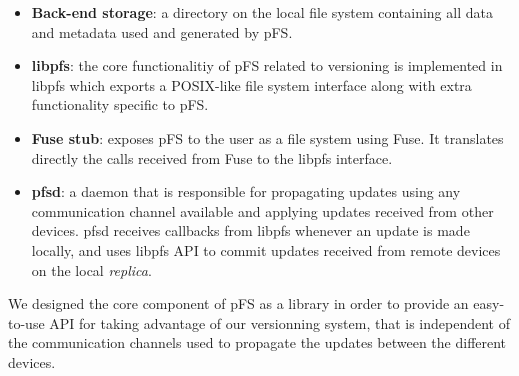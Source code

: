 \begin {itemize}
\item \textbf{Back-end storage}: a directory on the local file system
  containing all data and metadata used and generated by pFS.
\item \textbf{libpfs}: the core functionalitiy of pFS related to
  versioning is implemented in libpfs which exports a POSIX-like file
  system interface along with extra functionality specific to pFS.
\item \textbf{Fuse stub}: exposes pFS to the user as a file system
  using Fuse. It translates directly the calls received from Fuse to
  the libpfs interface.
\item \textbf{pfsd}: a daemon that is responsible for propagating
  updates using any communication channel available and applying
  updates received from other devices. pfsd receives callbacks
  from libpfs whenever an update is made locally, and uses libpfs API
  to commit updates received from remote devices on the local
  \emph{replica}.
\end {itemize}

We designed the core component of pFS as a library in order to provide
an easy-to-use API for taking advantage of our versionning system,
that is independent of the communication channels used to propagate
the updates between the different devices.




